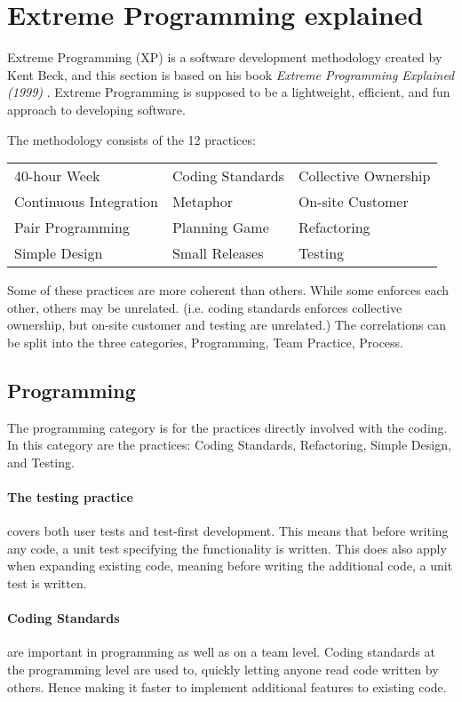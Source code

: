 \section{Extreme Programming explained}
Extreme Programming (XP) is a software development methodology created by Kent Beck, and this section is based on his book \textit{Extreme Programming Explained (1999)} \citep{xp:explained}. 
Extreme Programming is supposed to be a lightweight, efficient, and fun approach to developing software.

\noindent The methodology consists of the 12 practices:

\begin{tabularx}{\textwidth}{X X X}
	40-hour Week				 & Coding Standards & Collective Ownership \\
	Continuous Integration	  & Metaphor         	 & On-site Customer     \\
	Pair Programming			& Planning Game		& Refactoring          \\
	Simple Design          		  & Small Releases   	& Testing             
\end{tabularx}

Some of these practices are more coherent than others. 
While some enforces each other, others may be unrelated. (i.e. coding standards enforces collective ownership, but on-site customer and testing are unrelated.)
The correlations can be split into the three categories, Programming, Team Practice, Process.

\subsection{Programming}
The programming category is for the practices directly involved with the coding.
In this category are the practices: Coding Standards, Refactoring, Simple Design, and Testing.

\paragraph{The testing practice} covers both user tests and test-first development.
This means that before writing any code, a unit test specifying the functionality is written.
This does also apply when expanding existing code, meaning before writing the additional code, a unit test is written.

\paragraph{Coding Standards} are important in programming as well as on a team level.
Coding standards at the programming level are used to, quickly letting anyone read code written by others.
Hence making it faster to implement additional features to existing code.

